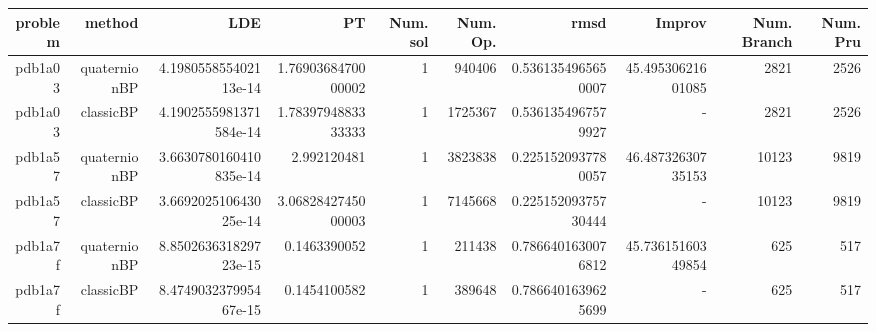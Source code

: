 \begin{tabular}{rrrrrrrrrr}
\hline\hline
\textbf{problem} & \textbf{method} & \textbf{LDE} & \textbf{PT } & \textbf{Num. sol} & \textbf{Num. Op.} & \textbf{rmsd} & \textbf{Improv} & \textbf{Num. Branch} & \textbf{Num. Pru} \\\hline
pdb1a03 & quaternionBP & 4.198055855402113e-14 & 1.7690368470000002 & 1 & 940406 & 0.5361354965650007 & 45.49530621601085 & 2821 & 2526 \\
pdb1a03 & classicBP & 4.1902555981371584e-14 & 1.7839794883333333 & 1 & 1725367 & 0.5361354967579927 &  -  & 2821 & 2526 \\
pdb1a57 & quaternionBP & 3.6630780160410835e-14 & 2.992120481 & 1 & 3823838 & 0.2251520937780057 & 46.48732630735153 & 10123 & 9819 \\
pdb1a57 & classicBP & 3.669202510643025e-14 & 3.0682842745000003 & 1 & 7145668 & 0.22515209375730444 &  -  & 10123 & 9819 \\
pdb1a7f & quaternionBP & 8.850263631829723e-15 & 0.1463390052 & 1 & 211438 & 0.7866401630076812 & 45.73615160349854 & 625 & 517 \\
pdb1a7f & classicBP & 8.474903237995467e-15 & 0.1454100582 & 1 & 389648 & 0.7866401639625699 &  -  & 625 & 517 \\\hline\hline
\end{tabular}
